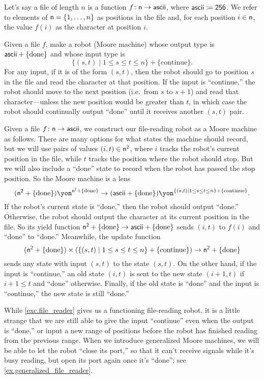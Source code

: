 \documentclass[Book-Poly]{subfiles}
\begin{document}
\begin{exercise}\label{exc.file_reader}
Let's say a file of length $n$ is a function $f\colon\mathsf{n}\to\mathsf{ascii}$, where $\mathsf{ascii}\coloneqq\textsf{2}\textsf{5}\textsf{6}$.
We refer to elements of $\mathsf{n}=\{1,\ldots,n\}$ as positions in the file and, for each position $i \in \mathsf{n}$, the value $f(i)$ as the character at position $i$.

Given a file $f$, make a robot (Moore machine) whose output type is $\mathsf{ascii} + \{\text{done}\}$
and whose input type is
\[
\{(s,t)\mid 1\leq s\leq t\leq n\}+\{\text{continue}\}.
\]
For any input, if it is of the form $(s,t)$, then the robot should go to position $s$ in the file and read the character at that position.
If the input is ``continue,'' the robot should move to the next position (i.e.\ from $s$ to $s+1$) and read that character—unless the new position would be greater than $t$, in which case the robot should continually output ``done'' until it receives another $(s,t)$ pair.
\begin{solution}
Given a file $f \colon \mathsf{n} \to \mathsf{ascii}$, we construct our file-reading robot as a Moore machine as follows.
There are many options for what states the machine should record, but we will use pairs of values $(i, t) \in \mathsf{n}^{\textsf{2}}$, where $i$ tracks the robot's current position in the file, while $t$ tracks the position where the robot should stop.
But we will also include a ``done'' state to record when the robot has passed the stop position.
So the Moore machine is a lens
\[
    (\ord{n}^\2+\{\text{done}\})\yon^{\ord{n}^\2+\{\text{done}\}} \to (\Set{ascii} + \{\text{done}\})\yon^{\{(s,t)\mid 1\leq s\leq t\leq n\}+\{\text{continue}\}}.
\]
If the robot's current state is ``done,'' then the robot should output ``done.'' Otherwise, the robot should output the character at its current position in the file.
So its yield function $\mathsf{n}^{\textsf{2}}+\{\text{done}\} \to \mathsf{ascii} + \{\text{done}\}$ sends $(i, t)$ to $f(i)$ and ``done'' to ``done.''
Meanwhile, the update function
\[
    (\mathsf{n}^{\textsf{2}}+\{\text{done}\}) \times (\{(s,t)\mid 1\leq s\leq t\leq n\}+\{\text{continue}\}) \to \mathsf{n}^{\textsf{2}}+\{\text{done}\}
\]
sends any state with input $(s,t)$ to the state $(s,t)$.
On the other hand, if the input is ``continue,'' an old state $(i,t)$ is sent to the new state $(i+1,t)$ if $i + 1 \leq t$ and ``done'' otherwise.
Finally, if the old state is ``done'' and the input is ``continue,'' the new state is still ``done.''
\end{solution}
\end{exercise}
While \cref{exc.file_reader} gives us a functioning file-reading robot, it is a little strange that we are still able to give the input ``continue'' even when the output is ``done,'' or input a new range of positions before the robot has finished reading from the previous range.
When we introduce generalized Moore machines, we will be able to let the robot ``close its port,'' so that it can't receive signals while it's busy reading, but open its port again once it's ``done''; see \cref{ex.generalized_file_reader}.
\end{document}
